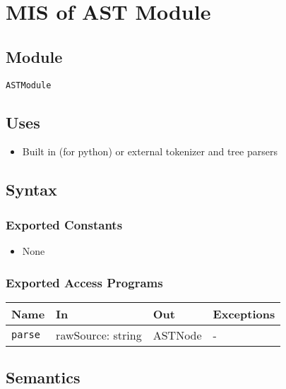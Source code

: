 \documentclass[12pt, titlepage]{article}
\begin{document}
\section{MIS of AST Module} \label{ASTModule}

\subsection{Module}

\texttt{ASTModule}

\subsection{Uses}

\begin{itemize}
    \item Built in (for python) or external tokenizer and tree parsers
\end{itemize}

\subsection{Syntax}

\subsubsection{Exported Constants}

\begin{itemize}
    \item None
\end{itemize}

\subsubsection{Exported Access Programs}

\begin{center}
\begin{tabular}{p{5cm} p{3.5cm} p{3.5cm} p{2cm}}
\hline
\textbf{Name} & \textbf{In} & \textbf{Out} & \textbf{Exceptions} \\
\hline
\texttt{parse} & rawSource: string & ASTNode & - \\
\hline
\end{tabular}
\end{center}

\subsection{Semantics}
\end{document}
